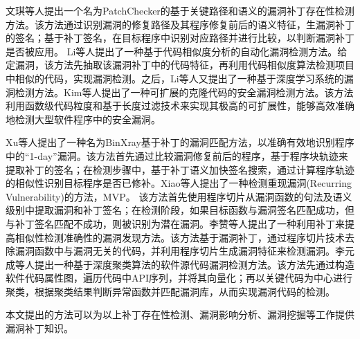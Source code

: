 文琪等人\cite{8文琪2020}提出一个名为PatchChecker的基于关键路径和语义的漏洞补丁存在性检测方法。该方法通过识别漏洞的修复路径及其程序修复前后的语义特征，生漏洞补丁的签名；基于补丁签名，在目标程序中识别对应路径并进行比较，以判断漏洞补丁是否被应用。%
Li等人\cite{li2016vulpecker}提出了一种基于代码相似度分析的自动化漏洞检测方法。给定漏洞，该方法先抽取该漏洞补丁中的代码特征，再利用代码相似度算法检测项目中相似的代码，实现漏洞检测。之后，Li等人\cite{li2018vuldeepecker}又提出了一种基于深度学习系统的漏洞检测方法。Kim等人\cite{kim2017vuddy}提出了一种可扩展的克隆代码的安全漏洞检测方法。该方法利用函数级代码粒度和基于长度过滤技术来实现其极高的可扩展性，能够高效准确地检测大型软件程序中的安全漏洞。

Xu等人\cite{xu2020patch}提出了一种名为BinXray基于补丁的漏洞匹配方法，以准确有效地识别程序中的“1-day”漏洞。该方法首先通过比较漏洞修复前后的程序，基于程序块轨迹来提取补丁的签名；在检测步骤中，基于补丁语义加快签名搜索，通过计算程序轨迹的相似性识别目标程序是否已修补。Xiao等人\cite{xiao2020mvp}提出了一种检测重现漏洞(Recurring Vulnerability)的方法，MVP。 该方法首先使用程序切片从漏洞函数的句法及语义级别中提取漏洞和补丁签名；在检测阶段，如果目标函数与漏洞签名匹配成功，但与补丁签名匹配不成功，则被识别为潜在漏洞。李赞等人\cite{22李赞2018}提出了一种利用补丁来提高相似性检测准确性的漏洞发现方法。该方法基于漏洞补丁，通过程序切片技术去除漏洞函数中与漏洞无关的代码，并利用程序切片生成漏洞特征来检测漏洞。李元成等人\cite{23李元诚2020}提出一种基于深度聚类算法的软件源代码漏洞检测方法。该方法先通过构造软件代码属性图，遍历代码中API序列，并将其向量化；再以关键代码为中心进行聚类，根据聚类结果判断异常函数并匹配漏洞库，从而实现漏洞代码的检测。

本文提出的方法可以为以上补丁存在性检测、漏洞影响分析、漏洞挖掘等工作提供漏洞补丁知识。


